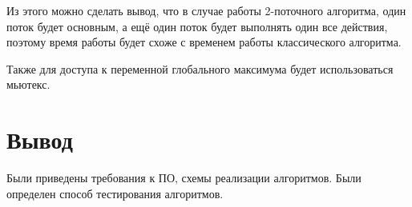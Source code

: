 Из этого можно сделать вывод, что в случае работы 2-поточного алгоритма, один поток будет основным,
а ещё один поток будет выполнять один все действия, поэтому время работы будет схоже с временем работы
классического алгоритма.

Также для доступа к переменной глобального максимума будет использоваться мьютекс.

\section{Вывод}
Были приведены требования к ПО, схемы реализации алгоритмов.
Были определен способ тестирования алгоритмов.
